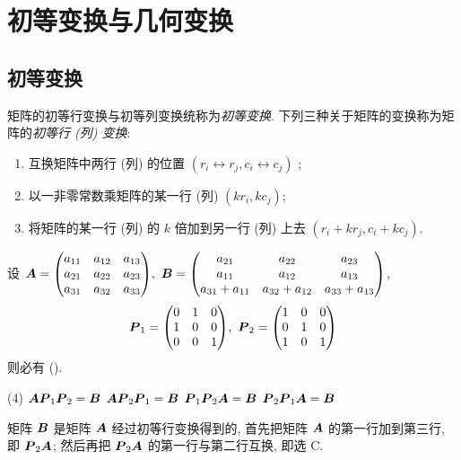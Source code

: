 \section{初等变换与几何变换}

\subsection{初等变换}

\begin{definition}[矩阵的初等变换]
    矩阵的初等行变换与初等列变换统称为\textit{初等变换}. 下列三种关于矩阵的变换称为矩阵的\textit{初等行 (列) 变换}:
    \begin{enumerate}[label=(\arabic{*})]
        \item 互换矩阵中两行 (列) 的位置 $ \left(r_{i} \leftrightarrow r_{j}, c_{i} \leftrightarrow c_{j}\right)$ ;
        \item 以一非零常数乘矩阵的某一行 (列) $ \left(k r_{i}, k c_{j}\right) $;
        \item 将矩阵的某一行 (列) 的 $ k $ 倍加到另一行 (列) 上去 $ \left(r_{i}+k r_{j}, c_{i}+k c_{j}\right) $.
    \end{enumerate}
\end{definition}

\begin{example}
    设 $\vb*{A}=\mqty(\xmat*{a}{3}{3}),~\vb*{B}=\mqty(a_{21}&a_{22}&a_{23}\\a_{11}&a_{12}&a_{13}\\a_{31}+a_{11}&a_{32}+a_{12}&a_{33}+a_{13})$, 
    $$\vb*{P}_1=\mqty(0&1&0\\1&0&0\\0&0&1),~\vb*{P}_2=\mqty(1&0&0\\0&1&0\\1&0&1)$$
    则必有 (\quad).
    \begin{tasks}(4)
        \task $\vb*{AP}_1\vb*{P}_2=\vb*{B}$
        \task $\vb*{AP}_2\vb*{P}_1=\vb*{B}$
        \task $\vb*{P}_1\vb*{P}_2\vb*{A}=\vb*{B}$
        \task $\vb*{P}_2\vb*{P}_1\vb*{A}=\vb*{B}$
    \end{tasks}
\end{example}
\begin{solution}
    矩阵 $\vb*{B}$ 是矩阵 $\vb*{A}$ 经过初等行变换得到的, 首先把矩阵 $\vb*{A}$ 的第一行加到第三行, 即 $\vb*{P}_2\vb*{A}$;
    然后再把 $\vb*{P}_2\vb*{A}$ 的第一行与第二行互换, 即选 C.
\end{solution}


